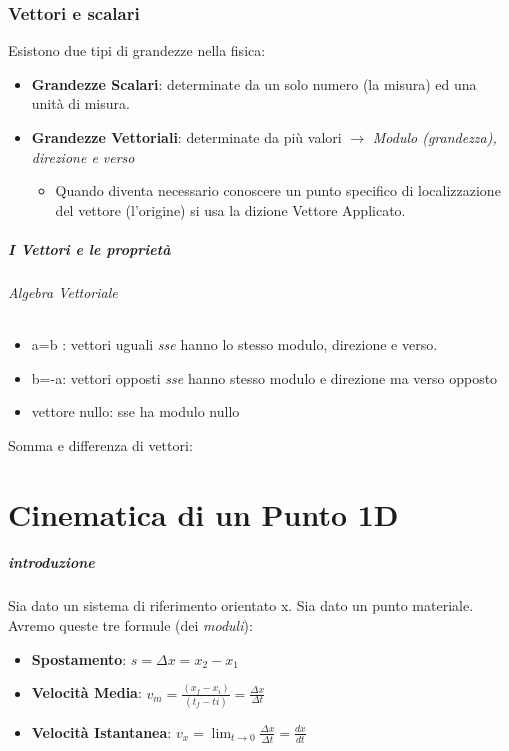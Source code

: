 \documentclass[12pt, a4paper, openany]{book}
\begin{document}
\subsection{Vettori e scalari} Esistono due tipi di grandezze nella fisica:
\begin{itemize}
    \item \textbf{Grandezze Scalari}: determinate da un solo numero (la misura) ed una unità di misura.
    \item \textbf{Grandezze Vettoriali}: determinate da più valori $\to$ \emph{Modulo (grandezza), direzione e verso}
          \begin{itemize}
              \item Quando diventa necessario conoscere un punto specifico di localizzazione del vettore (l'origine) si usa la dizione Vettore Applicato.
          \end{itemize}
\end{itemize}
\paragraph{I Vettori e le proprietà}

\subparagraph*{Algebra Vettoriale}

\begin{itemize}
    \item a=b : vettori uguali \emph{sse} hanno lo stesso modulo, direzione e verso.
    \item b=-a: vettori opposti \emph{sse} hanno stesso modulo e direzione ma verso opposto
    \item vettore nullo: sse ha modulo nullo
\end{itemize}
Somma e differenza di vettori:

\chapter{Cinematica di un Punto 1D}
\paragraph{introduzione}
Sia dato un sistema di riferimento orientato x.
Sia dato un punto materiale.
Avremo queste tre formule (dei \emph{moduli}):
\begin{itemize}
    \item \textbf{Spostamento}: $s=\Delta x = x_2-x_1$
    \item \textbf{Velocità Media}: $v_m = \frac{(x_f-x_i)}{(t_f-ti)} = \frac{\Delta x}{\Delta t}$
    \item \textbf{Velocità Istantanea}: $v_x = \lim_{t\to 0} \frac{\Delta x}{\Delta t} = \frac{dx}{dt}$
\end{itemize}
\end{document}

